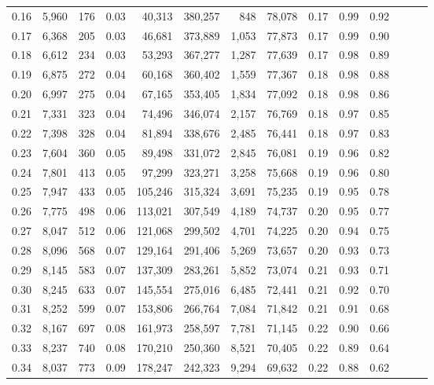 \begin{tabular}{rrrrrrrrrrrrrr}
0.16 &  5,960 &    176 &  0.03 &   40,313 &  380,257 &     848 &  78,078 &  0.17 &  0.99 &      0.92 \\
0.17 &  6,368 &    205 &  0.03 &   46,681 &  373,889 &   1,053 &  77,873 &  0.17 &  0.99 &      0.90 \\
0.18 &  6,612 &    234 &  0.03 &   53,293 &  367,277 &   1,287 &  77,639 &  0.17 &  0.98 &      0.89 \\
0.19 &  6,875 &    272 &  0.04 &   60,168 &  360,402 &   1,559 &  77,367 &  0.18 &  0.98 &      0.88 \\
0.20 &  6,997 &    275 &  0.04 &   67,165 &  353,405 &   1,834 &  77,092 &  0.18 &  0.98 &      0.86 \\
0.21 &  7,331 &    323 &  0.04 &   74,496 &  346,074 &   2,157 &  76,769 &  0.18 &  0.97 &      0.85 \\
0.22 &  7,398 &    328 &  0.04 &   81,894 &  338,676 &   2,485 &  76,441 &  0.18 &  0.97 &      0.83 \\
0.23 &  7,604 &    360 &  0.05 &   89,498 &  331,072 &   2,845 &  76,081 &  0.19 &  0.96 &      0.82 \\
0.24 &  7,801 &    413 &  0.05 &   97,299 &  323,271 &   3,258 &  75,668 &  0.19 &  0.96 &      0.80 \\
0.25 &  7,947 &    433 &  0.05 &  105,246 &  315,324 &   3,691 &  75,235 &  0.19 &  0.95 &      0.78 \\
0.26 &  7,775 &    498 &  0.06 &  113,021 &  307,549 &   4,189 &  74,737 &  0.20 &  0.95 &      0.77 \\
0.27 &  8,047 &    512 &  0.06 &  121,068 &  299,502 &   4,701 &  74,225 &  0.20 &  0.94 &      0.75 \\
0.28 &  8,096 &    568 &  0.07 &  129,164 &  291,406 &   5,269 &  73,657 &  0.20 &  0.93 &      0.73 \\
0.29 &  8,145 &    583 &  0.07 &  137,309 &  283,261 &   5,852 &  73,074 &  0.21 &  0.93 &      0.71 \\
0.30 &  8,245 &    633 &  0.07 &  145,554 &  275,016 &   6,485 &  72,441 &  0.21 &  0.92 &      0.70 \\
0.31 &  8,252 &    599 &  0.07 &  153,806 &  266,764 &   7,084 &  71,842 &  0.21 &  0.91 &      0.68 \\
0.32 &  8,167 &    697 &  0.08 &  161,973 &  258,597 &   7,781 &  71,145 &  0.22 &  0.90 &      0.66 \\
0.33 &  8,237 &    740 &  0.08 &  170,210 &  250,360 &   8,521 &  70,405 &  0.22 &  0.89 &      0.64 \\
0.34 &  8,037 &    773 &  0.09 &  178,247 &  242,323 &   9,294 &  69,632 &  0.22 &  0.88 &      0.62 \\

\end{tabular}
